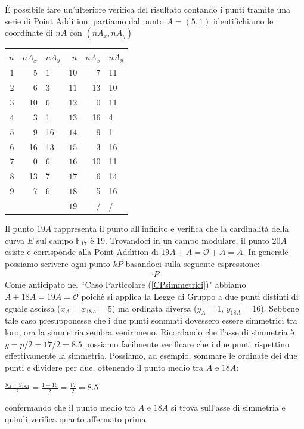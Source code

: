 \documentclass[a4paper,12pt]{tesiinfo}
\newcommand\ddfrac[2]{\frac{\displaystyle #1}{\displaystyle #2}}
\begin{document}
\`E possibile fare un'ulteriore verifica del risultato contando i punti tramite una serie di Point Addition: partiamo dal punto $A=(5, 1)$ identifichiamo le coordinate di $nA$ con $(nA_x, nA_y)$ 
\begin{center}
\begin{tabular}{ r r l | r r l}
 $n$ & $nA_x$ & $nA_y$ & $n$ & $nA_x$ & $nA_y$\\
 \hline
 $1$ & 5 & 1 & $10$ & 7 & 11 \\
 $2$ & 6 & 3 & $11$ & 13 & 10\\
 $3$ & 10 & 6 & $12$ & 0 & 11\\
 $4$ & 3 & 1 & $13$ & 16 & 4\\
 $5$ & 9 & 16 & $14$ & 9 & 1\\
 $6$ & 16 & 13 & $15$ & 3 & 16\\
 $7$ & 0 & 6 & $16$ & 10 & 11\\
 $8$ & 13 & 7 & $17$ & 6 & 14\\
 $9$ & 7 & 6 & $18$ & 5 & 16\\
 & & & $19$ & / & /
\end{tabular}
\end{center}
Il punto $19A$ rappresenta il punto all'infinito e verifica che la cardinalit\`a della curva $E$ sul campo $\mathbb{F}_{17}$ \`e 19. Trovandoci in un campo modulare, il punto $20A$ esiste e corrisponde alla Point Addition di $19A+A=\mathcal{O}+A = A$. In generale possiamo scrivere ogni punto $kP$ basandoci sulla seguente espressione:
\begin{gather}
[k \text{ mod} (\#E_K)] \cdot P
\label{punti modulari}
\end{gather}
Come anticipato nel ``Caso Particolare (\ref{CPsimmetrici})" abbiamo $A+18A = 19A = \mathcal{O}$ poich\`e si applica la Legge di Gruppo a due punti distinti di eguale ascissa ($x_A=x_{18A}=5$) ma ordinata diversa ($y_A=1$, $y_{18A}=16$). Sebbene tale caso presupponesse che i due punti sommati dovessero essere simmetrici tra loro, ora la simmetria sembra venir meno. Ricordando che l'asse di simmetria \`e $y= p \big / 2 = 17 \big / 2 = 8.5$ possiamo facilmente verificare che i due punti rispettino effettivamente la simmetria. Possiamo, ad esempio, sommare le ordinate dei due punti e dividere per due, ottenendo il punto medio tra $A$ e $18A$:
\begin{center}
 $\ddfrac{y_A+y_{18A}}{2}=\ddfrac{1+16}{2}=\ddfrac{17}{2}=8.5$
\end{center}
confermando che il punto medio tra $A$ e $18A$ si trova sull'asse di simmetria e quindi verifica quanto affermato prima. 
\end{document}
